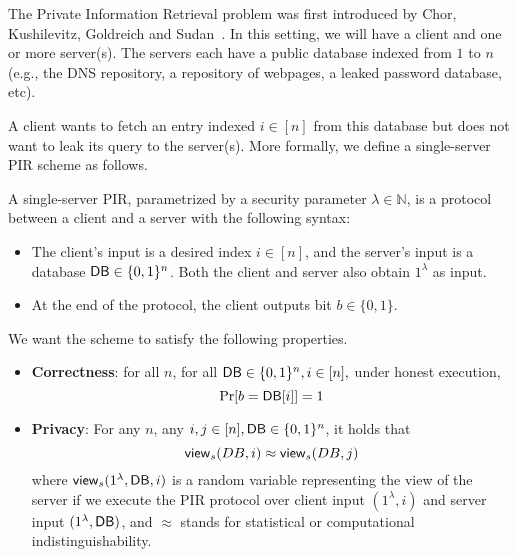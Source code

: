 
The Private Information Retrieval problem was first introduced by Chor, Kushilevitz, Goldreich and Sudan~\cite{chor1998private}.
In this setting, we will have a client and 
one or more server(s). The servers each have a public database indexed from $1$ to $n$ (e.g., the DNS repository, 
a repository of webpages, a leaked password database, etc).

A client wants to fetch an entry 
indexed $i \in [n]$ 
from this database 
but does not want to leak its query to the server(s). More formally,
we define a single-server PIR scheme as follows.

\begin{definition}
A single-server PIR, parametrized
by a security parameter $\lambda \in \mathbb{N}$, is a 
protocol between a client and a server with the following
syntax: 
\begin{itemize}
	\item The client's input is a desired 
index $i \in [n]$, and the server's input is a database ${\sf DB} \in \{0,1\}^n$.
Both the client and server also obtain $1^\lambda$ as input. 
	\item At the end of the protocol, the client outputs bit $b \in \{0,1\}$.
\end{itemize}

We want the scheme to satisfy the following properties.
\begin{itemize}
\item \textbf{Correctness}: for all $n$, 
for all ${\sf DB} \in \{0,1\}^n, i \in [n],$ under honest execution, 
	\[\Pr[b = \DB[i]] = 1 %
\]
	
\item \textbf{Privacy}: For any $n$, any 
$i,j \in [n], {\sf DB}  \in \{0,1\}^n$, 
it holds that  
	\[{\sf view}_s(DB,i) \approx {\sf view}_s(DB,j)\]
where ${\sf view}_{s}(1^\lambda, {\sf DB}, i)$ 
is a random variable representing the view of the server  
if we execute the PIR protocol 
over client input $(1^\lambda, i)$ and server input $(1^\lambda, {\sf DB})$, 
and $\approx$ stands for 
statistical or computational indistinguishability.
\end{itemize}
\end{definition}

